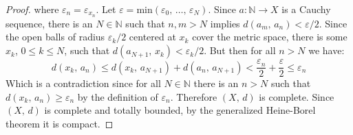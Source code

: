 \documentclass{article}
\theoremstyle{plain}
\theoremstyle{normal}
\begin{document}
\begin{proof}
            where $\varepsilon_{n}=\varepsilon_{x_{n}}$. Let
            $\varepsilon=\textrm{min}(\varepsilon_{0},\,\dots,\,\varepsilon_{N})$.
            Since $a:\mathbb{N}\rightarrow{X}$ is a Cauchy sequence, there is
            an $N\in\mathbb{N}$ such that $n,m>N$ implies
            $d(a_{m},\,a_{n})<\varepsilon/2$. Since the open balls of
            radius $\varepsilon_{k}/2$ centered at $x_{k}$ cover the metric
            space, there is some $x_{k}$, $0\leq{k}\leq{N}$, such that
            $d(a_{N+1},\,x_{k})<\varepsilon_{k}/2$. But then for all
            $n>N$ we have:
            \begin{equation}
                d(x_{k},\,a_{n})\leq{d}(x_{k},\,a_{N+1})+d(a_{n},\,a_{N+1})
                    <\frac{\varepsilon_{n}}{2}+\frac{\varepsilon}{2}
                    \leq\varepsilon_{n}
            \end{equation}
            Which is a contradiction since for all $N\in\mathbb{N}$ there is
            an $n>N$ such that $d(x_{k},\,a_{n})\geq\varepsilon_{n}$ by
            the definition of $\varepsilon_{n}$. Therefore
            $(X,\,d)$ is complete. Since $(X,\,d)$ is complete and totally
            bounded, by the generalized Heine-Borel theorem it is compact.
        \end{proof}
\end{document}
